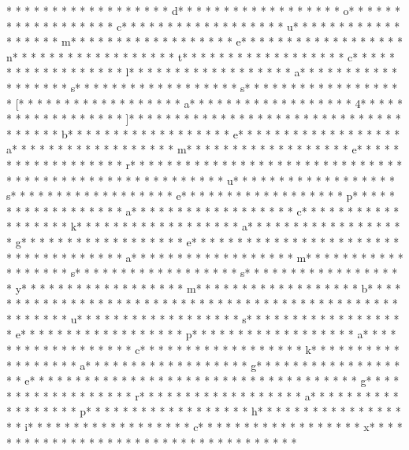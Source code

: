* * *  * * *  * * *  *  * * *  *  * * *  * d* * *  * * *  * * *  *  * * *  *  * * *  * o* * *  * * *  * * *  *  * * *  *  * * *  * c* * *  * * *  * * *  *  * * *  *  * * *  * u* * *  * * *  * * *  *  * * *  *  * * *  * m* * *  * * *  * * *  *  * * *  *  * * *  * e* * *  * * *  * * *  *  * * *  *  * * *  * n* * *  * * *  * * *  *  * * *  *  * * *  * t* * *  * * *  * * *  *  * * *  *  * * *  * c* * *  * * *  * * *  *  * * *  *  * * *  * l* * *  * * *  * * *  *  * * *  *  * * *  * a* * *  * * *  * * *  *  * * *  *  * * *  * s* * *  * * *  * * *  *  * * *  *  * * *  * s* * *  * * *  * * *  *  * * *  *  * * *  * [* * *  * * *  * * *  *  * * *  *  * * *  * a* * *  * * *  * * *  *  * * *  *  * * *  * 4* * *  * * *  * * *  *  * * *  *  * * *  * ]* * *  * * *  * * *  *  * * *  *  * * *  * {* * *  * * *  * * *  *  * * *  *  * * *  * b* * *  * * *  * * *  *  * * *  *  * * *  * e* * *  * * *  * * *  *  * * *  *  * * *  * a* * *  * * *  * * *  *  * * *  *  * * *  * m* * *  * * *  * * *  *  * * *  *  * * *  * e* * *  * * *  * * *  *  * * *  *  * * *  * r* * *  * * *  * * *  *  * * *  *  * * *  * }* * *  * * *  * * *  *  * * *  *  * * *  * 
* * *  * * *  * * *  *  * * *  *  * * *  * u* * *  * * *  * * *  *  * * *  *  * * *  * s* * *  * * *  * * *  *  * * *  *  * * *  * e* * *  * * *  * * *  *  * * *  *  * * *  * p* * *  * * *  * * *  *  * * *  *  * * *  * a* * *  * * *  * * *  *  * * *  *  * * *  * c* * *  * * *  * * *  *  * * *  *  * * *  * k* * *  * * *  * * *  *  * * *  *  * * *  * a* * *  * * *  * * *  *  * * *  *  * * *  * g* * *  * * *  * * *  *  * * *  *  * * *  * e* * *  * * *  * * *  *  * * *  *  * * *  * {* * *  * * *  * * *  *  * * *  *  * * *  * a* * *  * * *  * * *  *  * * *  *  * * *  * m* * *  * * *  * * *  *  * * *  *  * * *  * s* * *  * * *  * * *  *  * * *  *  * * *  * s* * *  * * *  * * *  *  * * *  *  * * *  * y* * *  * * *  * * *  *  * * *  *  * * *  * m* * *  * * *  * * *  *  * * *  *  * * *  * b* * *  * * *  * * *  *  * * *  *  * * *  * }* * *  * * *  * * *  *  * * *  *  * * *  * 
* * *  * * *  * * *  *  * * *  *  * * *  * u* * *  * * *  * * *  *  * * *  *  * * *  * s* * *  * * *  * * *  *  * * *  *  * * *  * e* * *  * * *  * * *  *  * * *  *  * * *  * p* * *  * * *  * * *  *  * * *  *  * * *  * a* * *  * * *  * * *  *  * * *  *  * * *  * c* * *  * * *  * * *  *  * * *  *  * * *  * k* * *  * * *  * * *  *  * * *  *  * * *  * a* * *  * * *  * * *  *  * * *  *  * * *  * g* * *  * * *  * * *  *  * * *  *  * * *  * e* * *  * * *  * * *  *  * * *  *  * * *  * {* * *  * * *  * * *  *  * * *  *  * * *  * g* * *  * * *  * * *  *  * * *  *  * * *  * r* * *  * * *  * * *  *  * * *  *  * * *  * a* * *  * * *  * * *  *  * * *  *  * * *  * p* * *  * * *  * * *  *  * * *  *  * * *  * h* * *  * * *  * * *  *  * * *  *  * * *  * i* * *  * * *  * * *  *  * * *  *  * * *  * c* * *  * * *  * * *  *  * * *  *  * * *  * x* * *  * * *  * * *  *  * * *  *  * * *  * }* * *  * * *  * * *  *  * * *  *  * * *  * 
